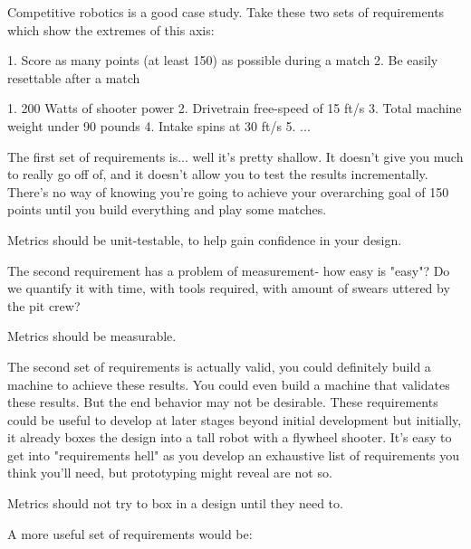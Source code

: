 
Competitive robotics is a good case study. Take these two sets of requirements which show the extremes of this axis:

1. Score as many points (at least 150) as possible during a match
2. Be easily resettable after a match

1. 200 Watts of shooter power
2. Drivetrain free-speed of 15 ft/s
3. Total machine weight under 90 pounds
4. Intake spins at 30 ft/s
5. 
...

The first set of requirements is... well it's pretty shallow. It doesn't give you much to really go off of, and it doesn't allow you to test the results incrementally. There's no way of knowing you're going to achieve your overarching goal of 150 points until you build everything and play some matches.

\begin{theorem}
	Metrics should be unit-testable, to help gain confidence in your design.
\end{theorem}

The second requirement has a problem of measurement- how easy is "easy"? Do we quantify it with time, with tools required, with amount of swears uttered by the pit crew?

\begin{theorem}
	Metrics should be measurable.
\end{theorem}

The second set of requirements is actually valid, you could definitely build a machine to achieve these results. You could even build a machine that validates these results. But the end behavior may not be desirable. These requirements could be useful to develop at later stages beyond initial development but initially, it already boxes the design into a tall robot with a flywheel shooter. It's easy to get into "requirements hell" as you develop an exhaustive list of requirements you think you'll need, but prototyping might reveal are not so.

\begin{theorem}
	Metrics should not try to box in a design until they need to.
\end{theorem}

A more useful set of requirements would be:

